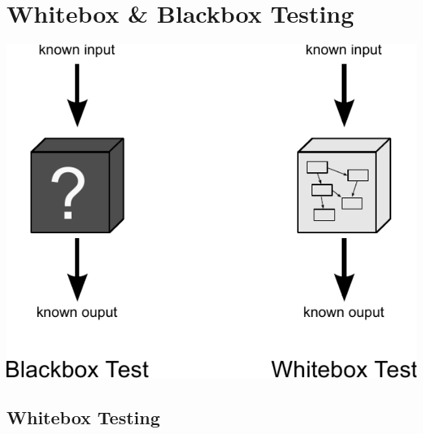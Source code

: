 
\section{Whitebox \& Blackbox Testing}


\begin{frame}
  \begin{center}
  \includegraphics[width=.5\textwidth]{images/Qualitaetssicherung/abbildungen/BlackBoxAndWhiteBoxTesting}
  \end{center}
\end{frame}


\subsection{Whitebox Testing}

